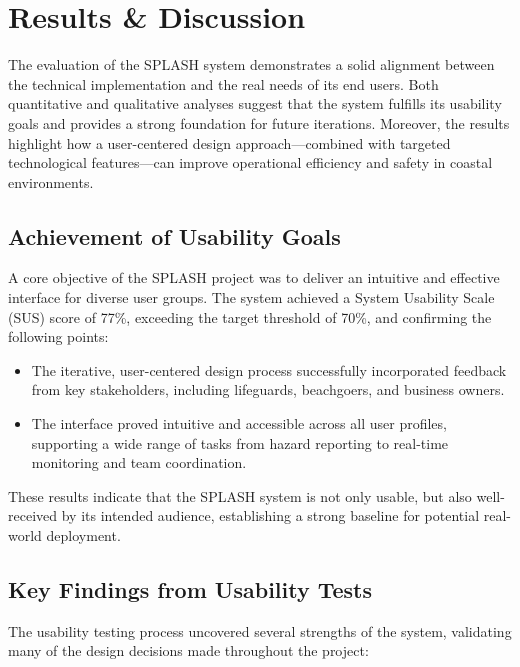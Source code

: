 \chapter{Results \& Discussion}
\label{chapter:Results}

The evaluation of the SPLASH system demonstrates a solid alignment between the technical implementation and the real needs of its end users. Both quantitative and qualitative analyses suggest that the system fulfills its usability goals and provides a strong foundation for future iterations. Moreover, the results highlight how a user-centered design approach—combined with targeted technological features—can improve operational efficiency and safety in coastal environments.

\section{Achievement of Usability Goals}
A core objective of the SPLASH project was to deliver an intuitive and effective interface for diverse user groups. The system achieved a System Usability Scale (SUS) score of 77\%, exceeding the target threshold of 70\%, and confirming the following points:

\begin{itemize}
    \item The iterative, user-centered design process successfully incorporated feedback from key stakeholders, including lifeguards, beachgoers, and business owners.
    \item The interface proved intuitive and accessible across all user profiles, supporting a wide range of tasks from hazard reporting to real-time monitoring and team coordination.
\end{itemize}

These results indicate that the SPLASH system is not only usable, but also well-received by its intended audience, establishing a strong baseline for potential real-world deployment.

\section{Key Findings from Usability Tests}
The usability testing process uncovered several strengths of the system, validating many of the design decisions made throughout the project:

